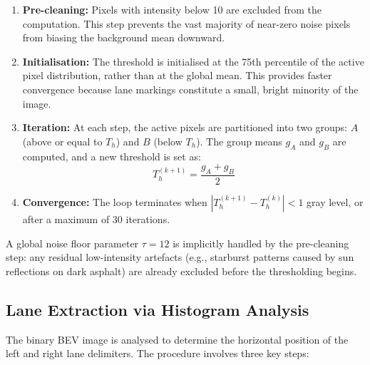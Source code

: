\documentclass[11pt,a4paper]{article}
\begin{document}
\begin{enumerate}
    \item \textbf{Pre-cleaning:} Pixels with intensity below 10 are excluded from the computation. This step prevents the vast majority of near-zero noise pixels from biasing the background mean downward.
    \item \textbf{Initialisation:} The threshold is initialised at the 75th percentile of the active pixel distribution, rather than at the global mean. This provides faster convergence because lane markings constitute a small, bright minority of the image.
    \item \textbf{Iteration:} At each step, the active pixels are partitioned into two groups: $A$ (above or equal to $T_h$) and $B$ (below $T_h$). The group means $g_A$ and $g_B$ are computed, and a new threshold is set as:
    \begin{equation}
        T_h^{(k+1)} = \frac{g_A + g_B}{2}
    \end{equation}
    \item \textbf{Convergence:} The loop terminates when $|T_h^{(k+1)} - T_h^{(k)}| < 1$ gray level, or after a maximum of 30 iterations.
\end{enumerate}

A global noise floor parameter $\tau = 12$ is implicitly handled by the pre-cleaning step: any residual low-intensity artefacts (e.g., starburst patterns caused by sun reflections on dark asphalt) are already excluded before the thresholding begins.


\subsection{Lane Extraction via Histogram Analysis}
\label{sec:extraction}

The binary BEV image is analysed to determine the horizontal position of the left and right lane delimiters. The procedure involves three key steps:
\end{document}
